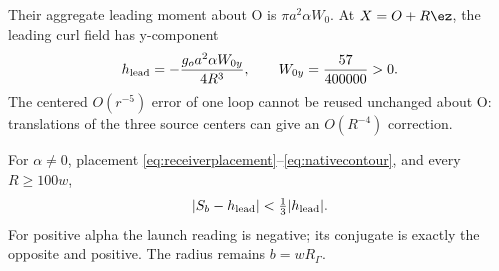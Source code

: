 Their aggregate leading moment about O is \(\pi a^2\alpha W_0\). At \(X=O+R\ez\), the leading curl field has y-component
\begin{equation}\label{eq:leadingcomponent}
h_{\rm lead}=-\frac{g_oa^2\alpha W_{0y}}{4R^3},\qquad
W_{0y}=\frac{57}{400000}>0.
\end{equation}
The centered \(O(r^{-5})\) error of one loop cannot be reused unchanged about O: translations of the three source centers can give an \(O(R^{-4})\) correction.

\begin{theorem}\label{thm:native}
For \(\alpha\ne0\), placement \eqref{eq:receiverplacement}--\eqref{eq:nativecontour}, and every \(R\ge100w\),
\begin{equation}\label{eq:thirdbound}
|S_b-h_{\rm lead}|<\tfrac13|h_{\rm lead}|.
\end{equation}
For positive alpha the launch reading is negative; its conjugate is exactly the opposite and positive. The radius remains \(b=wR_\Gamma\).
\end{theorem}

